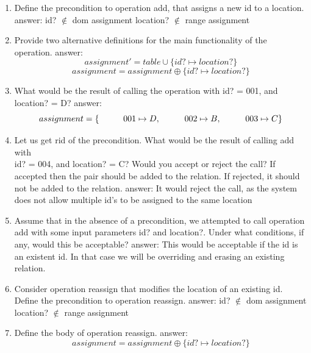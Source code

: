 \documentclass[12pt]{article}
\begin{document}
\begin{enumerate}
	\item Define the precondition to operation add, that assigns a new id to a location.
	\subitem answer:
	\subitem id? $ \notin $ dom assignment
	\subitem location? $ \notin $ range assignment
	\item Provide two alternative definitions for the main functionality of the operation.	
	\subitem answer:
	\[ assignment' = table \cup \{ id? \mapsto location? \} \] 
	\[ assignment = assignment \oplus  \{ id? \mapsto location? \} \]
	\item What would be the result of calling the operation with id? = 001, and location? = D?
	\subitem answer:
	\[
	assignment = \\
	\{ \\
	\hspace{10mm} 001 \mapsto D,\\
	\hspace{10mm} 002 \mapsto B,\\
	\hspace{10mm} 003 \mapsto C\\
	\}
	\]
	\item Let us get rid of the precondition. What would be the result of calling add with\\ id? = 004, and location? = C? Would you accept or reject the call? If accepted then the pair should be added to the relation. If rejected, it should not be added to the relation.
	\subitem answer:
	\subitem It would reject the call, as the system does not allow multiple id's to be assigned to the same location
	\item Assume that in the absence of a precondition, we attempted to call operation add with some input parameters id? and location?. Under what conditions, if any, would this be acceptable?
	\subitem answer:
	\subitem This would be acceptable if the id is an existent id. 
	\subitem In that case we will be overriding and erasing an existing relation.
	\item Consider operation reassign that modifies the location of an existing id. Define the precondition to operation reassign.
	\subitem answer:
	\subitem id? $ \notin $ dom assignment
	\subitem location? $ \notin $ range assignment
	\item Define the body of operation reassign.
	\subitem answer:
	\[ assignment = assignment \oplus  \{ id? \mapsto location? \} \]

\end{enumerate}
\newpage
\end{document}
